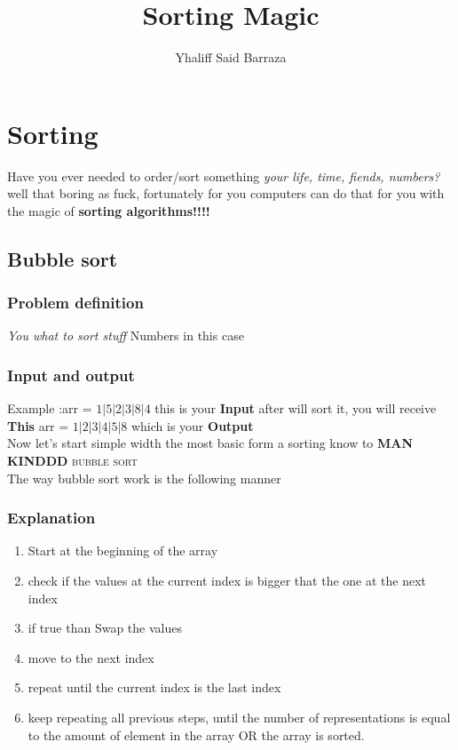 \documentclass{article}
\author{Yhaliff Said Barraza}
\title{Sorting Magic}
\begin{document}
\maketitle
\section{Sorting}
Have you ever needed to order/sort something \textit{your life, time, fiends, numbers? } well that boring as fuck, fortunately for you computers can do that for you with the magic of \textbf{sorting algorithms!!!!} \\
\subsection{Bubble sort} 
\subsubsection{Problem definition}
\label{subsub:ProbDef}
\textit{You what to sort stuff } Numbers in this case
\subsubsection{Input and output}
\label{subsub:In&Out}
Example :arr = $1|5|2|3|8|4$ this is your \textbf{Input} after will sort it, you will receive\\
\textbf{This} arr = $1|2|3|4|5|8$ which is your \textbf{Output}\\


Now let's start simple width the most basic form a sorting know to \textbf{MAN KINDDD } \textsc{bubble sort}\\
The way bubble sort work is the following manner \\
\subsubsection{Explanation}

\begin{enumerate}
\item Start at the beginning of the array \\
\item check if the values at the current index is bigger that the one at the next index \\
\item if true than Swap the values \\
\item move to the next index \\
\item repeat until the current index is the last index \\
\item keep repeating all previous steps, until the number of representations is equal to the amount of element in the array OR the array is sorted.\\\\
\end{enumerate}
\end{document}
